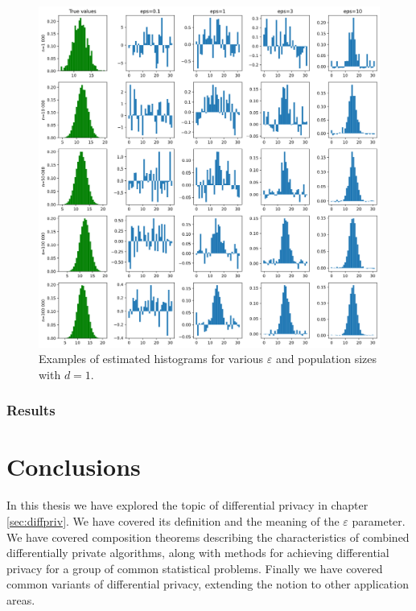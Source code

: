 \documentclass[12pt]{article}
\renewcommand{\epsilon}{\varepsilon}
\begin{document}
\begin{description}
    \begin{figure}
        \centering
        \includegraphics[width=\textwidth]{imgs/histogram_matrix.png}
        \caption{Examples of estimated histograms for various $\epsilon$ and population sizes with $d=1$.}
        \label{fig:histogram_matrix}
    \end{figure}
\end{description}

\subsubsection{Results}

\section{Conclusions}

In this thesis we have explored the topic of differential privacy in chapter \ref{sec:diffpriv}. We have covered its definition and the meaning of the $\epsilon$ parameter. We have covered composition theorems describing the characteristics of combined differentially private algorithms, along with methods for achieving differential privacy for a group of common statistical problems. Finally we have covered common variants of differential privacy, extending the notion to other application areas.
\end{document}
